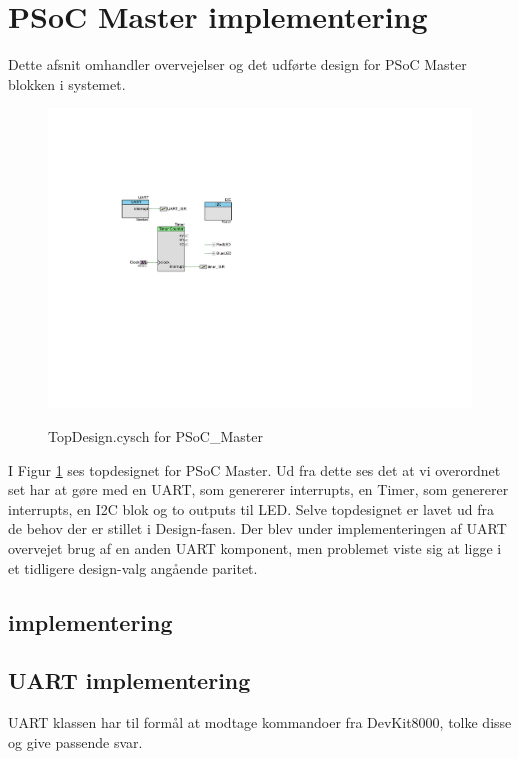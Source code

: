 \section{PSoC Master implementering} \label{sec:PSoC_Master_impl}

Dette afsnit omhandler overvejelser og det udførte design for PSoC Master blokken i systemet.

\begin{figure}[h]
\centering
\includegraphics[width=\textwidth*3/5, trim=145 270 475 170, clip=true]{../fig/TopDesign_PSoC_Master}
\label{fig:psoc_master_topdesign}
\caption{TopDesign.cysch for PSoC\_Master}
\end{figure}

I Figur \ref{fig:psoc_master_topdesign} ses topdesignet for PSoC Master. Ud fra dette ses det at vi overordnet set har at gøre med en UART, som genererer interrupts, en Timer, som genererer interrupts, en I2C blok og to outputs til LED. 
Selve topdesignet er lavet ud fra de behov der er stillet i Design-fasen. Der blev under implementeringen af UART overvejet brug af en anden UART komponent, men problemet viste sig at ligge i et tidligere design-valg angående paritet.

\clearpage

\subsection{\IIC implementering}

\subsection{UART implementering}
UART klassen har til formål at modtage kommandoer fra DevKit8000, tolke disse og give passende svar. 

